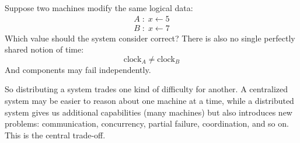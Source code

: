 \highspace
Suppose two machines modify the same logical data:
\begin{gather*}
    A \; : \; x \leftarrow 5 \\
    B \; : \; x \leftarrow 7
\end{gather*}
Which value should the system consider correct? There is also no single perfectly shared notion of time:
\begin{equation*}
    \text{clock}_{A} \neq \text{clock}_B
\end{equation*}
And components may fail independently.

\highspace
So distributing a system trades one kind of difficulty for another. A centralized system may be easier to reason about one machine at a time, while a distributed system gives us additional capabilities (many machines) but also introduces new problems: communication, concurrency, partial failure, coordination, and so on. This is the central trade-off.

